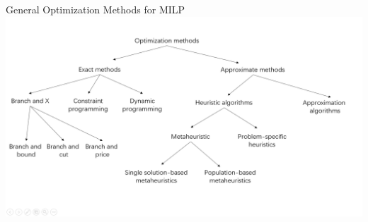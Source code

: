     \begin{frame}{General Optimization Methods for MILP}
        \centering
        \includegraphics[width = 1\textwidth]{images/opt.png}
    \end{frame}

